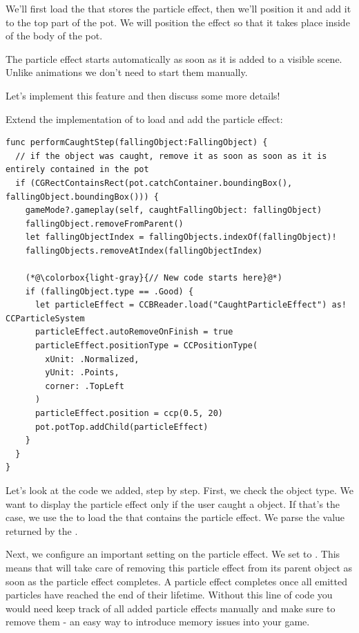 We'll first load the \ccbfile{} that stores the particle effect, then we'll
position it and add it to the top part of the pot. We will position the effect
so that it takes place inside of the body of the pot. 

The particle effect starts
automatically as soon as it is added to a visible scene. Unlike animations we
don't need to start them manually.

Let's implement this feature and then discuss some more details!

\begin{leftbar}
Extend the implementation of  to
load and add the particle effect:
\begin{lstlisting}
func performCaughtStep(fallingObject:FallingObject) {
  // if the object was caught, remove it as soon as soon as it is entirely contained in the pot
  if (CGRectContainsRect(pot.catchContainer.boundingBox(), fallingObject.boundingBox())) {
    gameMode?.gameplay(self, caughtFallingObject: fallingObject)
    fallingObject.removeFromParent()
    let fallingObjectIndex = fallingObjects.indexOf(fallingObject)!
    fallingObjects.removeAtIndex(fallingObjectIndex)
    
    (*@\colorbox{light-gray}{// New code starts here}@*)
    if (fallingObject.type == .Good) {
      let particleEffect = CCBReader.load("CaughtParticleEffect") as! CCParticleSystem
      particleEffect.autoRemoveOnFinish = true
      particleEffect.positionType = CCPositionType(
        xUnit: .Normalized,
        yUnit: .Points,
        corner: .TopLeft
      )
      particleEffect.position = ccp(0.5, 20)
      pot.potTop.addChild(particleEffect)
    }
  }
}
\end{lstlisting}
\end{leftbar}
Let's look at the code we added, step by step. First, we check the object type.
We want to display the particle effect only if the user caught a
 object. If that's the case, we use the 
to load the \ccbfile{} that contains the particle effect. We parse the value
returned by the .

Next, we configure an important setting on the particle effect. We set
 to . This means that \cocos{}
will take care of removing this particle effect from its parent object as soon
as the particle effect completes. A particle effect completes once all emitted
particles have reached the end of their lifetime. Without this line of code you
would need keep track of all added particle effects manually and make sure to
remove them - an easy way to introduce memory issues into your game.

